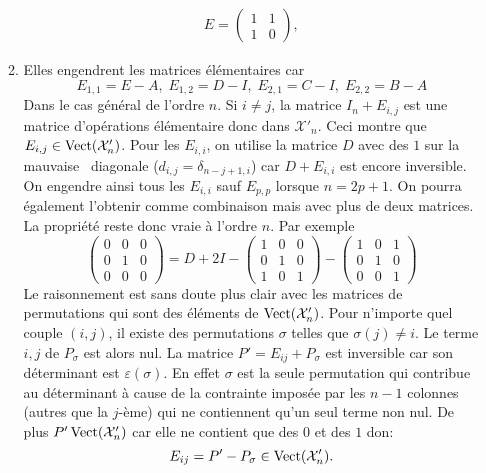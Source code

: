 \begin{enumerate}
\begin{enumerate}
\begin{multline*}
E=
\begin{pmatrix}
1 & 1 \\ 1 & 0  
\end{pmatrix},
\end{multline*}
  \item Elles engendrent les matrices élémentaires car
\begin{displaymath}
E_{1,1}=E-A, \;E_{1,2}=D-I, \;E_{2,1}=C-I, \;E_{2,2}=B-A   
\end{displaymath}
Dans le cas général de l'ordre $n$. Si $i\neq j$, la matrice $I_n + E_{i,j}$ est une matrice d'opérations élémentaire donc dans $\mathcal{X}'_n$. Ceci montre que $E_{i,j}\in \operatorname{Vect}(\mathcal{X}'_n)$.
Pour les $E_{i,i}$, on utilise la matrice $D$ avec des $1$ sur la \og mauvaise\fg~ diagonale ($d_{i,j}=\delta _{n-j+1,i}$) car $D+E_{i,i}$ est encore inversible. On engendre ainsi tous les $E_{i,i}$ sauf $E_{p,p}$ lorsque $n=2p+1$. On pourra également l'obtenir comme combinaison mais avec plus de deux matrices. La propriété reste donc vraie à l'ordre $n$. Par exemple
\begin{displaymath}
\begin{pmatrix}
 0 & 0 & 0 \\ 0 & 1 & 0 \\ 0 & 0 & 0 
\end{pmatrix} = 
D + 2I 
-\begin{pmatrix}
1 & 0 & 0 \\ 0 & 1 & 0 \\ 1 & 0 & 1   
\end{pmatrix}
-\begin{pmatrix}
1 & 0 & 1 \\ 0 & 1 & 0 \\ 0 & 0 & 1   
\end{pmatrix}
\end{displaymath}
Le raisonnement est sans doute plus clair avec les matrices de permutations qui sont des éléments de $\operatorname{Vect}(\mathcal{X}'_n)$.\newline
Pour n'importe quel couple $(i,j)$, il existe des permutations $\sigma$ telles que $\sigma(j) \neq i$. Le terme $i,j$ de $P_\sigma$ est alors nul. La matrice $P' = E_{i j} + P_\sigma$ est inversible car son déterminant est $\varepsilon(\sigma)$. En effet $\sigma$ est la seule permutation qui contribue au déterminant à cause de la contrainte imposée par les $n-1$ colonnes (autres que la $j$-ème) qui ne contiennent qu'un seul terme non nul. De plus $P'\operatorname{Vect}(\mathcal{X}'_n)$ car elle ne contient que des $0$ et des $1$ don:
\[
 E_{i j} = P' - P_\sigma \in \operatorname{Vect}(\mathcal{X}'_n).
\]


\end{enumerate}
\end{enumerate}

